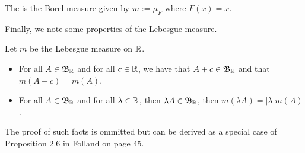 \documentclass[11pt,leqno,oneside]{amsbook}
\numberwithin{thm}{section}
\begin{document}
  \begin{defn}
    The  is the Borel measure given by \(m :=
    \mu_F\) where \(F(x)=x\). 
  \end{defn}
  Finally, we note some properties of the Lebesgue measure.
  \begin{prop}
    Let \(m\) be the Lebesgue measure on \({\mathbb R}\).
  \begin{itemize}
  \item For all $A \in \mathfrak{B}_{\mathbb R}$ and for all $c \in {\mathbb R}$, we have that
    $A+c \in \mathfrak{B}_{\mathbb R}$ and that $m(A+c) = m(A)$.
  \item For all $A \in \mathfrak{B}_{\mathbb R}$ and for all $\lambda \in {\mathbb R}$, then
    $\lambda A \in \mathfrak{B}_{\mathbb R}$, then $m(\lambda A) = |\lambda| m(A)$. 
  \end{itemize}    
  \end{prop}
  The proof of such facts is ommitted but can be derived as a special
  case of Proposition 2.6 in Folland on page 45.
\end{document}
